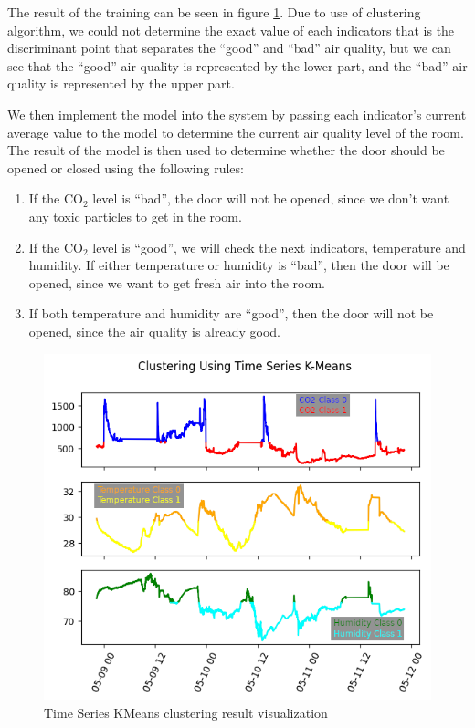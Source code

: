 The result of the training can be seen in
figure \ref{kmeans}. Due to use of clustering algorithm, we could not
determine the exact value of each indicators that is the
discriminant point that separates the ``good'' and ``bad''
air quality, but we can see that the ``good'' air quality is
represented by the lower part, and the ``bad'' air quality is
represented by the upper part.

We then implement the model into the system by passing each
indicator's current average value to the model to determine
the current air quality level of the room. The result of the
model is then used to determine whether the door should be
opened or closed using the following rules:
\begin{enumerate}
    \item If the CO$_2$ level is ``bad'', the door will not be
          opened, since we don't want any toxic particles to
          get in the room.
    \item If the CO$_2$ level is ``good'', we will check the
          next indicators, temperature and humidity. If
          either temperature or humidity is ``bad'', then the
          door will be opened, since we want to get fresh
          air into the room.
    \item If both temperature and humidity are ``good'',
          then the door will not be opened, since the air
          quality is already good.
\end{enumerate}

\begin{figure}
    \centerline{\includegraphics[scale=0.65]{resources/iot-clustering.png}}
    \caption{Time Series KMeans clustering result visualization}
    \label{kmeans}
\end{figure}
